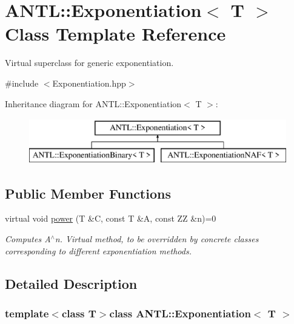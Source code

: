 \hypertarget{classANTL_1_1Exponentiation}{\section{A\-N\-T\-L\-:\-:Exponentiation$<$ T $>$ Class Template Reference}
\label{classANTL_1_1Exponentiation}
}


Virtual superclass for generic exponentiation.  




{\ttfamily \#include $<$Exponentiation.\-hpp$>$}

Inheritance diagram for A\-N\-T\-L\-:\-:Exponentiation$<$ T $>$\-:\begin{figure}[H]
\begin{center}
\leavevmode
\includegraphics[height=2.000000cm]{dd/da0/classANTL_1_1Exponentiation}
\end{center}
\end{figure}
\subsection*{Public Member Functions}
\begin{DoxyCompactItemize}
\item 
virtual void \hyperlink{classANTL_1_1Exponentiation_aad4e3be9ab770361f04a10a85d390622}{power} (T \&C, const T \&A, const Z\-Z \&n)=0
\begin{DoxyCompactList}\small\item\em Computes A$^\wedge$n. Virtual method, to be overridden by concrete classes corresponding to different exponentiation methods. \end{DoxyCompactList}\end{DoxyCompactItemize}


\subsection{Detailed Description}
\subsubsection*{template$<$class T$>$class A\-N\-T\-L\-::\-Exponentiation$<$ T $>$}

